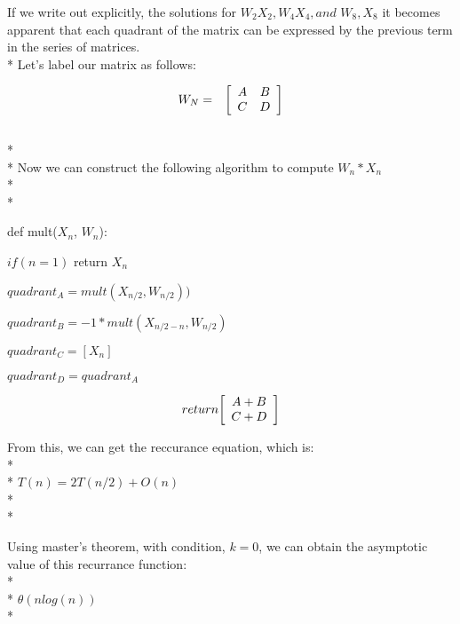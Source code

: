 \documentclass{article}
\begin{document}
\begin{solution}

If we write out explicitly, the solutions for $W_2X_2, W_4X_4, and$ $W_8,X_8$ it becomes apparent that each quadrant of the matrix can be expressed by the previous term in the series of matrices. 
\\*
Let's label our matrix as follows:

\begin{eqnarray*}
	W_N &=& {\left[ \begin{array}{cc}
					A & B \\
					C & D
				\end{array}
				 \right] }
\end{eqnarray*}
\\*\\*
Now we can construct the following algorithm to compute $W_n * X_n$
\\*\\*

\xxx def mult($X_n$, $W_n$):


	\xxx$if(n = 1)$
		return $X_n$
	
	\xxx$quadrant_A = mult(X_{n/2}, W_{n/2}))$
	
	\xxx$quadrant_B = -1 * mult(X_{n/2 - n}, W_{n/2})$
	
	\xxx$quadrant_C = [X_n]$
	
	\xxx$quadrant_D = quadrant_A$
	
\begin{eqnarray*}
	return
	{\left[ \begin{array}{cc}
					A + B \\
					C + D
				\end{array}
				 \right] }
\end{eqnarray*}

From this, we can get the reccurance equation, which is: 
\\*\\*
$T(n) = 2T(n/2) + O(n)$
\\*\\*

Using master's theorem, with condition, $k = 0$, we can obtain the asymptotic value of this recurrance function:
\\*\\*
$\theta(n log(n))$
\\*

\end{solution}


\end{document}
